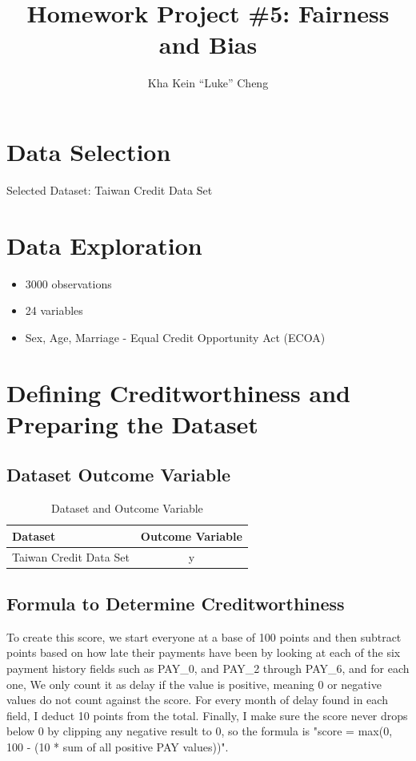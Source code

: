 \documentclass[
	letterpaper, %
]{jdf}
\author{Kha Kein “Luke” Cheng}
\title{Homework Project \#5: Fairness and Bias}
\begin{document}

\maketitle

\section{ Data Selection }
Selected Dataset: Taiwan Credit Data Set 

\section{ Data Exploration}
\begin{itemize}
    \item 3000 observations
    \item 24 variables
    \item Sex, Age, Marriage - Equal Credit Opportunity Act (ECOA)
\end{itemize}


\section{Defining Creditworthiness and Preparing the Dataset}
\subsection{Dataset Outcome Variable}
\begin{table}[h]
\centering
\begin{tabular}{|l|c|}
\hline
\textbf{Dataset} & \textbf{Outcome Variable} \\ \hline
Taiwan Credit Data Set & y \\ \hline
\end{tabular}
\caption{Dataset and Outcome Variable}
\label{tab:taiwan_dataset}
\end{table}

\subsection{Formula to Determine Creditworthiness}
To create this score, we start everyone at a base of 100 points and then subtract points based on how late their payments have been by looking at each of the six payment history fields such as PAY\_0, and PAY\_2 through PAY\_6, and for each one, We only count it as delay if the value is positive, meaning 0 or negative values do not count against the score. For every month of delay found in each field, I deduct 10 points from the total. Finally, I make sure the score never drops below 0 by clipping any negative result to 0, so the formula is "score = max(0, 100 - (10 * sum of all positive PAY values))".
\end{document}
